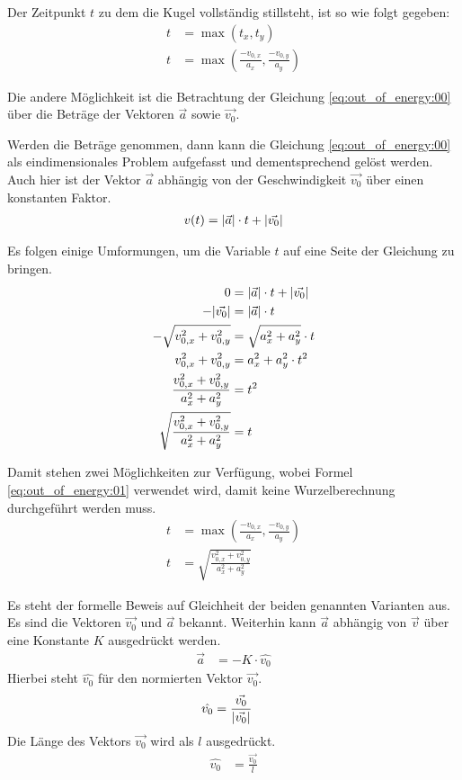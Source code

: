 Der Zeitpunkt $t$ zu dem die Kugel vollständig stillsteht, ist so wie folgt gegeben:
\begin{align}
    t &= \max{(t_x, t_y)}\\
    t &= \max{(\frac{-v_{0,x}}{a_x}, \frac{-v_{0,y}}{a_y})}
\end{align}

Die andere Möglichkeit ist die Betrachtung der Gleichung \ref{eq:out_of_energy:00} über die Beträge der Vektoren
$\vec{a}$ sowie $\vec{v_0}$.

Werden die Beträge genommen, dann kann die Gleichung \ref{eq:out_of_energy:00} als eindimensionales Problem aufgefasst und
dementsprechend gelöst werden. Auch hier ist der Vektor $\vec{a}$ abhängig von der Geschwindigkeit $\vec{v_0}$ über einen
konstanten Faktor.
\begin{align}
    v(t) = \lvert \vec{a} \rvert \cdot t + \lvert \vec{v_0} \rvert
\end{align}

Es folgen einige Umformungen, um die Variable $t$ auf eine Seite der Gleichung zu bringen.
\begin{align}
    0 &= \lvert \vec{a} \rvert \cdot t + \lvert \vec{v_0} \rvert\\
    -\lvert \vec{v_0} \rvert &= \lvert \vec{a} \rvert \cdot t\\
    -\sqrt{v_{0,x}^2 + v_{0,y}^2} &= \sqrt{a_x^2 + a_y^2} \cdot t\\
    v_{0,x}^2 + v_{0,y}^2 &= a_x^2 + a_y^2 \cdot t^2\\
    \frac{v_{0,x}^2 + v_{0,y}^2}{a_x^2 + a_y^2} &= t^2\\
    \sqrt{\frac{v_{0,x}^2 + v_{0,y}^2}{a_x^2 + a_y^2}} &= t
\end{align}

Damit stehen zwei Möglichkeiten zur Verfügung, wobei Formel \ref{eq:out_of_energy:01} verwendet wird, damit
keine Wurzelberechnung durchgeführt werden muss.
\begin{align}
    t &= \max{(\frac{-v_{0,x}}{a_x}, \frac{-v_{0,y}}{a_y})}\label{eq:out_of_energy:01}\\
    t &= \sqrt{\frac{v_{0,x}^2 + v_{0,y}^2}{a_x^2 + a_y^2}}
\end{align}

Es steht der formelle Beweis auf Gleichheit der beiden genannten Varianten aus.
Es sind die Vektoren $\vec{v_0}$ und $\vec{a}$ bekannt. Weiterhin kann $\vec{a}$ abhängig von $\vec{v}$
über eine Konstante $K$ ausgedrückt werden.
\begin{align}
    \vec{a} &= -K \cdot \hat{v_0}
\end{align}
Hierbei steht $\hat{v_0}$ für den normierten Vektor $\vec{v_0}$.
\begin{align}
    \hat{v_0} &= \frac{\vec{v_0}}{\lvert \vec{v_0} \rvert}
\end{align}
Die Länge des Vektors $\vec{v_0}$ wird als $l$ ausgedrückt.
\begin{align}
    \hat{v_0} &= \frac{\vec{v_0}}{l}
\end{align}

